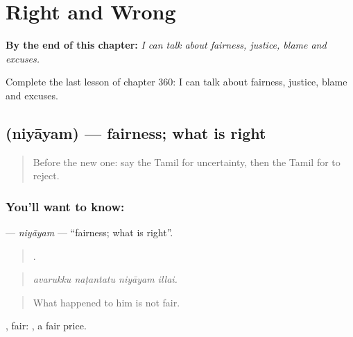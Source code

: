 
\chapter{Right and Wrong}
\label{ch:ta-right-and-wrong}

\begin{chapteropening}
\textbf{By the end of this chapter:} \emph{I can talk about fairness, justice, blame and excuses.}

Complete the last lesson of chapter 360: I can talk about fairness, justice, blame and excuses.
\end{chapteropening}

\section[\texorpdfstring{\ta{நியாயம்} (niyāyam)}{நியாயம் (niyāyam)}]{ (niyāyam) — fairness; what is right}

\label{lesson:TA-C360-niyayam}



\begin{quote}
Before the new one: say the Tamil for uncertainty, then the Tamil for to reject.
\end{quote}

\subsection*{You'll want to know: }
\textbf{} — \emph{niyāyam} — \textquotedblleft{}fairness; what is right\textquotedblright{}.

\begin{quote}
   .
\end{quote}

\begin{quote}
\emph{avarukku naṭantatu niyāyam illai.}
\end{quote}

\begin{quote}
What happened to him is not fair.
\end{quote}

, fair:  , a fair price.

